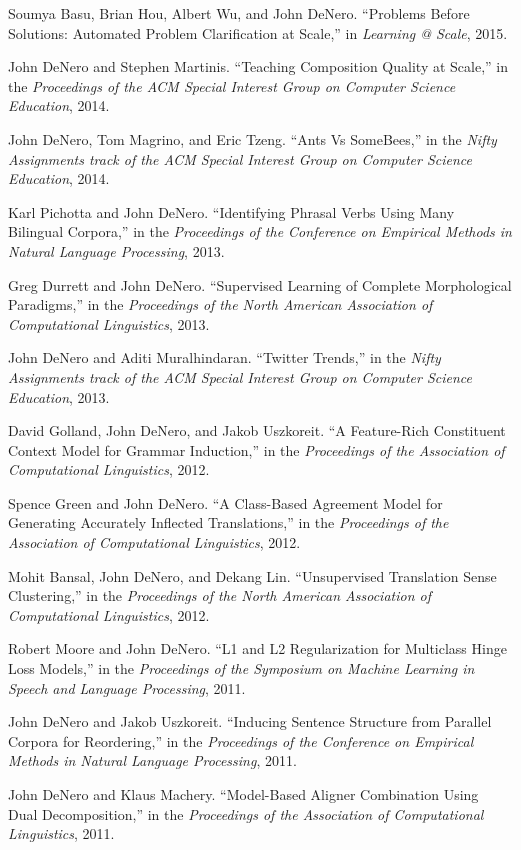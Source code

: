 \documentclass[margin,line]{res}
\begin{document}
\begin{resume}
Soumya Basu, Brian Hou, Albert Wu, and John DeNero. ``Problems Before Solutions: Automated Problem Clarification at Scale,'' in {\it Learning @ Scale}, 2015.

John DeNero and Stephen Martinis.  ``Teaching Composition Quality at Scale,'' in the {\it Proceedings of the ACM Special Interest Group on Computer Science Education}, 2014.

John DeNero, Tom Magrino, and Eric Tzeng.  ``Ants Vs SomeBees,'' in the {\it Nifty Assignments track of the ACM Special Interest Group on Computer Science Education}, 2014.

Karl Pichotta and John DeNero.  ``Identifying Phrasal Verbs Using Many Bilingual Corpora,'' in the {\it Proceedings of the Conference on Empirical Methods in Natural Language Processing}, 2013.

Greg Durrett and John DeNero.  ``Supervised Learning of Complete Morphological Paradigms,'' in the {\it Proceedings of the North American Association of Computational Linguistics}, 2013.

John DeNero and Aditi Muralhindaran.  ``Twitter Trends,'' in the {\it Nifty Assignments track of the ACM Special Interest Group on Computer Science Education}, 2013.

David Golland, John DeNero, and Jakob Uszkoreit. ``A Feature-Rich Constituent Context Model for Grammar Induction,'' in the {\it Proceedings of the Association of Computational Linguistics}, 2012.

Spence Green and John DeNero. ``A Class-Based Agreement Model for Generating Accurately Inflected Translations,'' in the {\it Proceedings of the Association of Computational Linguistics}, 2012.

Mohit Bansal, John DeNero, and Dekang Lin. ``Unsupervised Translation Sense Clustering,'' in the {\it Proceedings of the North American Association of Computational Linguistics}, 2012.

Robert Moore and John DeNero. ``L1 and L2 Regularization for Multiclass Hinge Loss Models,'' in the {\it Proceedings of the Symposium on Machine Learning in Speech and Language Processing}, 2011.

John DeNero and Jakob Uszkoreit.  ``Inducing Sentence Structure from Parallel Corpora for Reordering,'' in the {\it Proceedings of the Conference on Empirical Methods in Natural Language Processing}, 2011.

John DeNero and Klaus Machery. ``Model-Based Aligner Combination Using Dual Decomposition,'' in the {\it Proceedings of the Association of Computational Linguistics}, 2011.


\end{resume}
\end{document}
